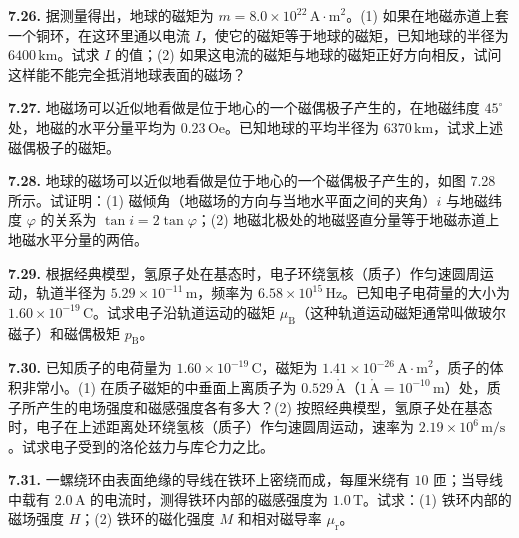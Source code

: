 \vfill
\newpage

\textbf{7.26.} 据测量得出，地球的磁矩为 $m = 8.0 \times 10^{22}\,\mathrm{A\cdot m}^{2}$。(1) 如果在地磁赤道上套一个铜环，在这环里通以电流 $I$，使它的磁矩等于地球的磁矩，已知地球的半径为 $6400\,\mathrm{km}$。试求 $I$ 的值；(2) 如果这电流的磁矩与地球的磁矩正好方向相反，试问这样能不能完全抵消地球表面的磁场？

\vfill
\newpage

\textbf{7.27.} 地磁场可以近似地看做是位于地心的一个磁偶极子产生的，在地磁纬度 $45^{\circ}$ 处，地磁的水平分量平均为 $0.23\,\mathrm{Oe}$。已知地球的平均半径为 $6370\,\mathrm{km}$，试求上述磁偶极子的磁矩。

\vfill
\newpage

\textbf{7.28.} 地球的磁场可以近似地看做是位于地心的一个磁偶极子产生的，如图 7.28 所示。试证明：(1) 磁倾角（地磁场的方向与当地水平面之间的夹角）$i$ 与地磁纬度 $\varphi$ 的关系为 $\tan i = 2\tan\varphi$；(2) 地磁北极处的地磁竖直分量等于地磁赤道上地磁水平分量的两倍。

\begin{center}
\end{center}

\vfill
\newpage

\textbf{7.29.} 根据经典模型，氢原子处在基态时，电子环绕氢核（质子）作匀速圆周运动，轨道半径为 $5.29 \times 10^{-11}\,\mathrm{m}$，频率为 $6.58 \times 10^{15}\,\mathrm{Hz}$。已知电子电荷量的大小为 $1.60 \times 10^{-19}\,\mathrm{C}$。试求电子沿轨道运动的磁矩 $\mu_{\mathrm{B}}$（这种轨道运动磁矩通常叫做玻尔磁子）和磁偶极矩 $p_{\mathrm{B}}$。

\vfill
\newpage

\textbf{7.30.} 已知质子的电荷量为 $1.60 \times 10^{-19}\,\mathrm{C}$，磁矩为 $1.41 \times 10^{-26}\,\mathrm{A\cdot m}^{2}$，质子的体积非常小。(1) 在质子磁矩的中垂面上离质子为 $0.529\,\mathring{\mathrm{A}}$（$1\,\mathring{\mathrm{A}} = 10^{-10}\,\mathrm{m}$）处，质子所产生的电场强度和磁感强度各有多大？(2) 按照经典模型，氢原子处在基态时，电子在上述距离处环绕氢核（质子）作匀速圆周运动，速率为 $2.19 \times 10^{6}\,\mathrm{m/s}$。试求电子受到的洛伦兹力与库仑力之比。

\vfill
\newpage

\textbf{7.31.} 一螺绕环由表面绝缘的导线在铁环上密绕而成，每厘米绕有 $10$ 匝；当导线中载有 $2.0\,\mathrm{A}$ 的电流时，测得铁环内部的磁感强度为 $1.0\,\mathrm{T}$。试求：(1) 铁环内部的磁场强度 $H$；(2) 铁环的磁化强度 $M$ 和相对磁导率 $\mu_{\mathrm{r}}$。

